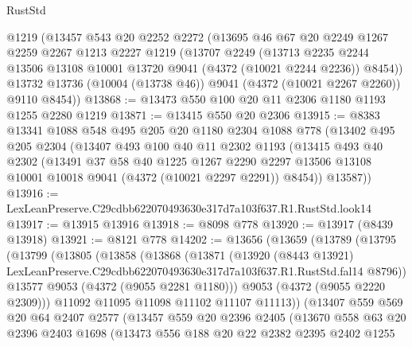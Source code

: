 \begin{lexlean}{RustStd}
\begin{coremodule}
    @1219
    (@13457
      @543
      @20
      @2252
      @2272
      (@13695
        @46
        @67
        @20
        @2249
        @1267
        @2259
        @2267
        @1213
        @2227
        @1219
        (@13707
          @2249
          (@13713 @2235 @2244 @13506 @13108 @10001 @13720 @9041 (@4372 (@10021 @2244 @2236)) @8454))
        @13732
        @13736
        (@10004 (@13738 @46))
        @9041
        (@4372 (@10021 @2267 @2260))
        @9110
        @8454))
@13868 := @13473 @550 @100 @20 @11 @2306 @1180 @1193 @1255 @2280 @1219
@13871 := @13415 @550 @20 @2306
@13915 := @8383
    @13341
    @1088
    @548
    @495
    @205
    @20
    @1180
    @2304
    @1088
    @778
    (@13402
      @495
      @205
      @2304
      (@13407
        @493
        @100
        @40
        @11
        @2302
        @1193
        (@13415
          @493
          @40
          @2302
          (@13491
            @37
            @58
            @40
            @1225
            @1267
            @2290
            @2297
            @13506
            @13108
            @10001
            @10018
            @9041
            (@4372 (@10021 @2297 @2291))
            @8454))
        @13587))
@13916 := LexLeanPreserve.C29cdbb622070493630e317d7a103f637.R1.RustStd.look14
@13917 := @13915 @13916
@13918 := @8098 @778
@13920 := @13917 (@8439 @13918)
@13921 := @8121 @778
@14202 := @13656
    (@13659
      (@13789
        (@13795
          (@13799
            (@13805
              (@13858
                (@13868
                  (@13871
                    (@13920
                      (@8443 @13921)
                      LexLeanPreserve.C29cdbb622070493630e317d7a103f637.R1.RustStd.fal14
                      @8796))
                  @13577
                  @9053
                  (@4372 (@9055 @2281 @1180)))
                @9053
                (@4372 (@9055 @2220 @2309)))
              @11092
              @11095
              @11098
              @11102
              @11107
              @11113))
          (@13407
            @559
            @569
            @20
            @64
            @2407
            @2577
            (@13457
              @559
              @20
              @2396
              @2405
              (@13670
                @558
                @63
                @20
                @2396
                @2403
                @1698
                (@13473
                  @556
                  @188
                  @20
                  @22
                  @2382
                  @2395
                  @2402
                  @1255

\end{coremodule}
\end{lexlean}
